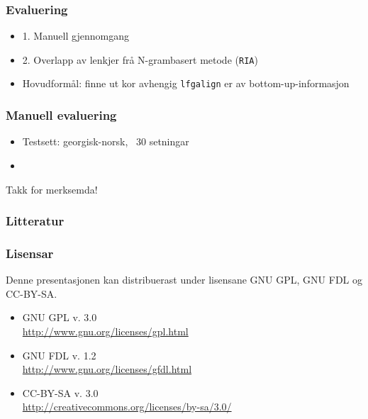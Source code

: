 \documentclass[bigger]{beamer}
\begin{document}
\begin{frame}\frametitle{Evaluering}
  \begin{itemize}
  \item 1. Manuell gjennomgang
  \item 2. Overlapp av lenkjer frå N-grambasert metode (\texttt{RIA})
  \item Hovudformål: finne ut kor avhengig \texttt{lfgalign} er av
    bottom-up-informasjon
  \end{itemize}
\end{frame}

\begin{frame}\frametitle{Manuell evaluering}
  \begin{itemize}
  \item Testsett: georgisk-norsk, ~30 setningar
  \item 
  \end{itemize}
\end{frame}



\begin{frame}
  \begin{center}
    {\huge Takk for merksemda!}
  \end{center}
\end{frame}

\begin{frame}\frametitle{Litteratur}
  \nocite{dyvik2009lmp}
  
  
\end{frame}

\begin{frame}\frametitle{Lisensar}
  Denne presentasjonen kan distribuerast under lisensane
  GNU GPL, GNU FDL og CC-BY-SA.
  \begin{itemize}
  \item GNU GPL v. 3.0 \\
    \href{http://www.gnu.org/licenses/gpl.html}{http://www.gnu.org/licenses/gpl.html}
  \item GNU FDL v. 1.2 \\
    \href{http://www.gnu.org/licenses/gfdl.html}{http://www.gnu.org/licenses/gfdl.html}
  \item CC-BY-SA v. 3.0 \\
    \href{http://creativecommons.org/licenses/by-sa/3.0/}{http://creativecommons.org/licenses/by-sa/3.0/}
  \end{itemize}
\end{frame}
\end{document}

